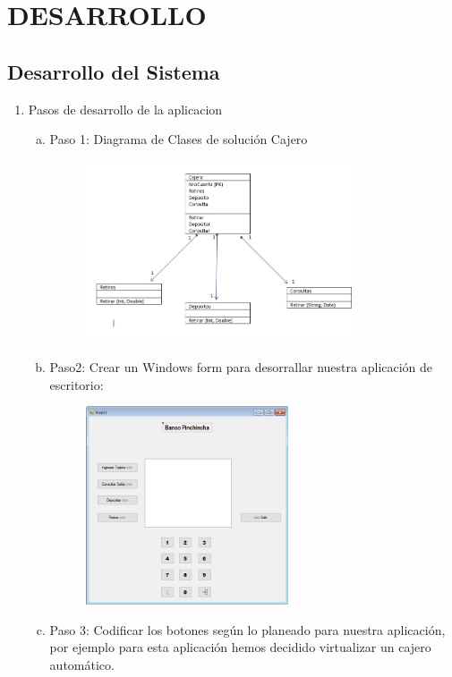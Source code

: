\section{DESARROLLO} 

\subsection{Desarrollo del Sistema}
\begin{enumerate}[1.]
	\item Pasos de desarrollo de la aplicacion
	\begin{enumerate}[a)]
	\item Paso 1: Diagrama de Clases de solución Cajero
		\begin{figure}[H]
		\begin{center}
		\includegraphics[width=8cm]{./Imagenes/img1}
		\end{center}
		\end{figure}
	\item Paso2: Crear un Windows form para desorrallar nuestra aplicación de escritorio:
		\begin{figure}[H]
		\begin{center}
		\includegraphics[width=6cm]{./Imagenes/img2}
		\end{center}
		\end{figure}
	\item Paso 3: Codificar los botones según lo planeado para nuestra aplicación, por ejemplo para esta aplicación hemos decidido 		virtualizar un cajero automático. \\

\end{enumerate}
\end{enumerate}
